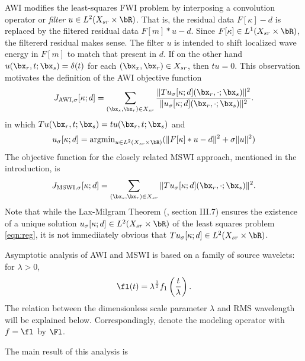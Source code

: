 AWI modifies the least-squares FWI problem by interposing a convolution operator or
{\em filter} $u \in L^2(X_{sr} \times \bR)$. That is, the residual
data $F[\kappa]-d$ is replaced by the filtered residual data $F[m]*u-d$.
Since $F[\kappa] \in L^1(X_{sr}\times \bR)$, the filtererd residual
makes sense.
The filter $u$ is intended to shift localized wave energy in $F[m]$ to
match that present in $d$. If on the other hand $u(\bx_r,t;\bx_s) =
\delta(t)$ for each $(\bx_x,\bx_r) \in X_{sr}$, then $tu = 0$. This
observation motivates the definition of the AWI objective function
\begin{equation}
  \label{eqn:awidefmain}
  J_{\rm AWI,\sigma}[\kappa;d] = \sum_{(\bx_s,\bx_r) \in X_{sr}}
  \frac{\|Tu_{\sigma}[\kappa;d](\bx_r,\cdot;\bx_s)\|^2}{\|u_{\sigma}[\kappa;d](\bx_r,\cdot;\bx_s)\|^2}.
\end{equation}
in which $Tu(\bx_r,t;\bx_s) = tu(\bx_r,t;\bx_s)$ and
\begin{equation}
  \label{eqn:reg}
  u_{\sigma}[\kappa;d] = \mbox{argmin}_{u \in L^2(X_{sr} \times \bR)} (\|F[\kappa]*u-d\|^2 + \sigma\|u\|^2)
\end{equation}
The objective function for the closely related MSWI approach,
mentioned in the introduction, is  
\begin{equation}
  \label{eqn:mswidefmain}
  J_{\rm MSWI,\sigma}[\kappa;d] = \sum_{(\bx_s,\bx_r) \in X_{sr}}
  \|Tu_{\sigma}[\kappa;d](\bx_r,\cdot;\bx_s)\|^2.
\end{equation}
Note that while the Lax-Milgram Theorem (\cite{Yosida}, section
III.7) ensures the existence of a unique solution
$u_{\sigma}[\kappa;d] \in L^2(X_{sr}\times \bR)$ of the least squares
problem \ref{eqn:reg},
it is not immediiately obvious that $Tu_{\sigma}[\kappa;d] \in L^2(X_{sr}\times \bR)$.

Asymptotic analysis of AWI and MSWI is based on a family of source
wavelets: for $\lambda > 0$,
\begin{equation}
  \fl(t)= \lambda^{\frac{1}{2}}f_1\left(\frac{t}{\lambda}\right).
\end{equation}
The relation between the dimensionless scale parameter $\lambda$ and
RMS wavelength will be explained below. Correspondingly, denote the
modeling operator with $f=\fl$ by $\Fl$.

The main result of this analysis is

